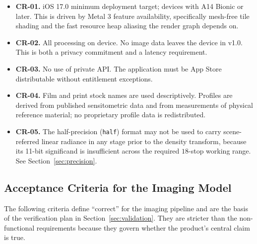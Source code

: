 \begin{itemize}
\item \textbf{CR-01.} iOS 17.0 minimum deployment target; devices with A14
Bionic or later. This is driven by Metal 3 feature availability, specifically
mesh-free tile shading and the fast resource heap aliasing the render graph
depends on.
\item \textbf{CR-02.} All processing on device. No image data leaves the
device in v1.0. This is both a privacy commitment and a latency requirement.
\item \textbf{CR-03.} No use of private API. The application must be
App Store distributable without entitlement exceptions.
\item \textbf{CR-04.} Film and print stock names are used descriptively.
Profiles are derived from published sensitometric data and from measurements of
physical reference material; no proprietary profile data is redistributed.
\item \textbf{CR-05.} The half-precision (\texttt{half}) format may not be used
to carry scene-referred linear radiance in any stage prior to the density
transform, because its 11-bit significand is insufficient across the required
$18$-stop working range. See Section~\ref{sec:precision}.
\end{itemize}

\subsection{Acceptance Criteria for the Imaging Model}

The following criteria define ``correct'' for the imaging pipeline and are the
basis of the verification plan in Section~\ref{sec:validation}. They are
stricter than the non-functional requirements because they govern whether the
product's central claim is true.

